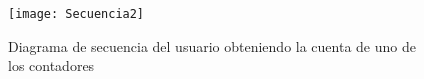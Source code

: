 \begin{figure}[h]
  \centering
  \texttt{[image: Secuencia2]}
  \caption{Diagrama de secuencia del usuario obteniendo la cuenta de uno de los contadores}\label{fig:secuencia2}
\end{figure}




\clearpage
